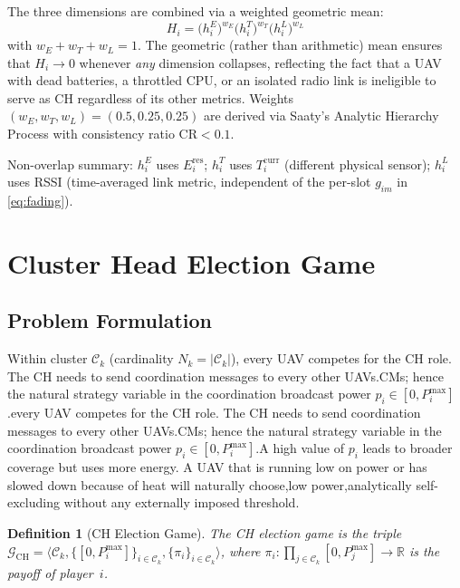 \documentclass[journal]{IEEEtran}
\newtheorem{definition}{Definition}
\begin{document}
The three dimensions are combined via a weighted geometric
mean:
\begin{equation}\label{eq:Hi}
  {H_{i}=\bigl(h_{i}^{E}\bigr)^{w_{E}}
               \bigl(h_{i}^{T}\bigr)^{w_{T}}
               \bigl(h_{i}^{L}\bigr)^{w_{L}}}
\end{equation}
with $w_{E}+w_{T}+w_{L}=1$.  The geometric (rather than
arithmetic) mean ensures that $H_{i}\to0$ whenever
\emph{any} dimension collapses, reflecting the fact that a
UAV with dead batteries, a throttled CPU, or an isolated
radio link is ineligible to serve as CH regardless of its
other metrics.  Weights $(w_{E},w_{T},w_{L})=(0.5,0.25,0.25)$
are derived via Saaty's Analytic Hierarchy Process with
consistency ratio $\mathrm{CR}<0.1$.

Non-overlap summary: $h_{i}^{E}$ uses $E_{i}^{\mathrm{res}}$;
$h_{i}^{T}$ uses $T_{i}^{\mathrm{curr}}$ (different physical
sensor); $h_{i}^{L}$ uses RSSI (time-averaged link metric,
independent of the per-slot $g_{im}$ in \eqref{eq:fading}).


\section{Cluster Head Election Game}\label{sec:game}
\subsection{Problem Formulation}

Within cluster $\mathcal{C}_{k}$ (cardinality
$N_{k}=|\mathcal{C}_{k}|$), every UAV competes for the CH
role. The CH needs to send coordination messages to every other UAVs.CMs; hence the natural strategy variable in the coordination  broadcast power $p_{i}\in[0,P_{i}^{\max}]$.every UAV competes for the CH
role. The CH needs to send coordination messages to every other UAVs.CMs; hence the natural strategy variable in the coordination  broadcast power $p_{i}\in[0,P_{i}^{\max}]$.A high value of $p_{i}$ leads to broader coverage but uses more energy. A UAV that is running low
on power or has slowed down because of heat will naturally choose,low power,analytically self-excluding without any externally imposed threshold.


\begin{definition}[CH Election Game]
The CH election game is the triple
$\mathcal{G}_{\mathrm{CH}}=\langle\mathcal{C}_{k},
\{[0,P_{i}^{\max}]\}_{i\in\mathcal{C}_{k}},
\{\pi_{i}\}_{i\in\mathcal{C}_{k}}\rangle$,
where $\pi_{i}:\prod_{j\in\mathcal{C}_{k}}[0,P_{j}^{\max}]\to\mathbb{R}$
is the payoff of player~$i$.
\end{definition}
\end{document}
